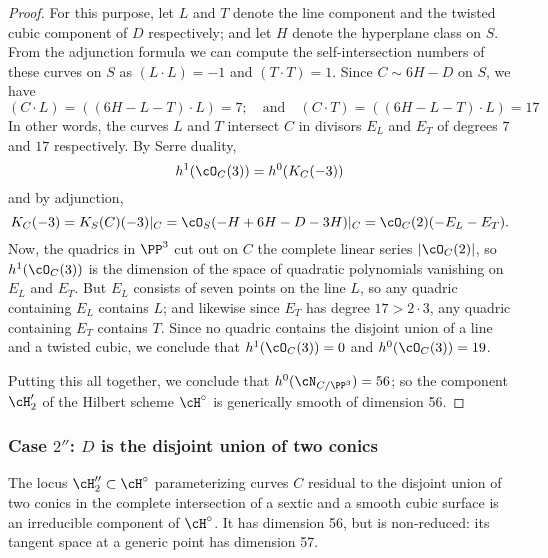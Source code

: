 \begin{proof}
For this purpose, let $L$ and $T$ denote the line component and the twisted cubic component of $D$ respectively; and let $H$ denote the hyperplane class on $S$. From the adjunction formula we can compute the self-intersection numbers of these curves on $S$ as $(L \cdot L) = -1$ and $(T \cdot T) = 1$. Since $C \sim 6H - D$ on $S$, we have
$$
(C\cdot L) = ((6H - L - T) \cdot L) = 7; \quad \text{and} \quad (C\cdot T) = ((6H - L - T) \cdot L) = 17
$$
In other words, the curves $L$ and $T$ intersect $C$ in divisors $E_L$ and $E_T$ of degrees $7$ and $17$ respectively. By Serre duality, 
$$
h^1(\cO_C(3)) = h^0(K_C(-3)) 
$$
and by adjunction,
$$
K_C(-3) = K_S(C)(-3)|_C = \cO_S(-H + 6H - D - 3H)|_C = \cO_C(2)(-E_L-E_T).
$$
Now, the quadrics in $\PP^3$ cut out on $C$ the complete linear series $|\cO_C(2)|$, 
so $h^1(\cO_C(3))$ is the dimension of the space of quadratic polynomials vanishing on $E_L$ and $E_T$. But $E_L$ consists of seven points on the line $L$, so any quadric containing $E_L$ contains $L$; and likewise since $E_T$ has degree $17 > 2\cdot 3$, any quadric containing $E_T$ contains $T$. Since no quadric contains the disjoint union of a line and a twisted cubic, we conclude that $h^1(\cO_C(3))=0$ and $h^0(\cO_C(3)) = 19$.

Putting this all together, we conclude that $h^0(\cN_{C/\PP^3}) = 56$; so the component $\cH_{2}'$ of the Hilbert scheme $\cH^\circ$ is generically smooth of dimension 56.
\end{proof}

\subsubsection{Case $2''$: $D$ is the disjoint union of two conics}

\begin{proposition}\label{mumford component}
The locus $\cH_{2}'' \subset \cH^\circ$ parameterizing curves $C$ residual to the disjoint union of two conics in the complete intersection of a sextic and a smooth cubic surface is an irreducible component of  $\cH^\circ$. It has dimension 56, but is non-reduced: its tangent space at
a generic point has dimension 57.
\end{proposition} 

